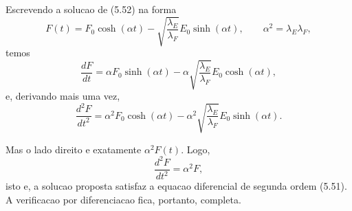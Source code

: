 Escrevendo a solucao de (5.52) na forma
\[
F(t)=F_0\cosh(\alpha t)-\sqrt{\frac{\lambda_E}{\lambda_F}}E_0\sinh(\alpha t),
\qquad
\alpha^2=\lambda_E\lambda_F,
\]
temos
\[
\frac{dF}{dt}=\alpha F_0\sinh(\alpha t)-\alpha\sqrt{\frac{\lambda_E}{\lambda_F}}E_0\cosh(\alpha t),
\]
e, derivando mais uma vez,
\[
\frac{d^2F}{dt^2}=\alpha^2F_0\cosh(\alpha t)-\alpha^2\sqrt{\frac{\lambda_E}{\lambda_F}}E_0\sinh(\alpha t).
\]

Mas o lado direito e exatamente $\alpha^2F(t)$. Logo,
\[
\frac{d^2F}{dt^2}=\alpha^2F,
\]
isto e, a solucao proposta satisfaz a equacao diferencial de segunda ordem (5.51). A verificacao por diferenciacao fica, portanto, completa.